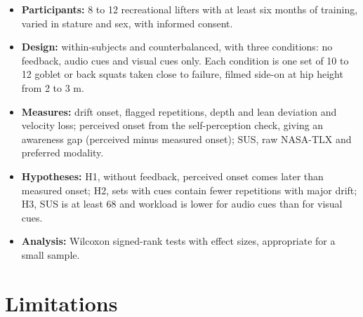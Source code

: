 \documentclass[12pt]{article}
\begin{document}
\begin{itemize}
    \item \textbf{Participants:} 8 to 12 recreational lifters with at least six months of training, varied in stature and sex, with informed consent.
    \item \textbf{Design:} within-subjects and counterbalanced, with three conditions: no feedback, audio cues and visual cues only. Each condition is one set of 10 to 12 goblet or back squats taken close to failure, filmed side-on at hip height from 2 to 3 m.
    \item \textbf{Measures:} drift onset, flagged repetitions, depth and lean deviation and velocity loss; perceived onset from the self-perception check, giving an awareness gap (perceived minus measured onset); SUS, raw NASA-TLX and preferred modality.
    \item \textbf{Hypotheses:} H1, without feedback, perceived onset comes later than measured onset; H2, sets with cues contain fewer repetitions with major drift; H3, SUS is at least 68 and workload is lower for audio cues than for visual cues.
    \item \textbf{Analysis:} Wilcoxon signed-rank tests with effect sizes, appropriate for a small sample.
\end{itemize}

\section{Limitations}
\end{document}

